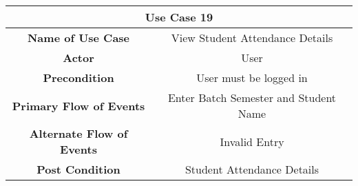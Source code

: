 \vspace{1cm}
\begin{center}
    \begin{tabular}{|c|c|}
        \hline
        \multicolumn{2}{|c|}{Use Case 19} \\
        \hline
        \textbf{Name of Use Case} & View Student Attendance Details \\
        \hline
        \textbf{Actor} & User \\
        \hline
        \textbf{Precondition} & User must be logged in \\
        \hline
        \textbf{Primary Flow of Events} & Enter Batch Semester and Student Name \\
        \hline
        \textbf{Alternate Flow of Events} & Invalid Entry \\
        \hline
        \textbf{Post Condition} & Student Attendance Details \\
        \hline
    \end{tabular}
\end{center}